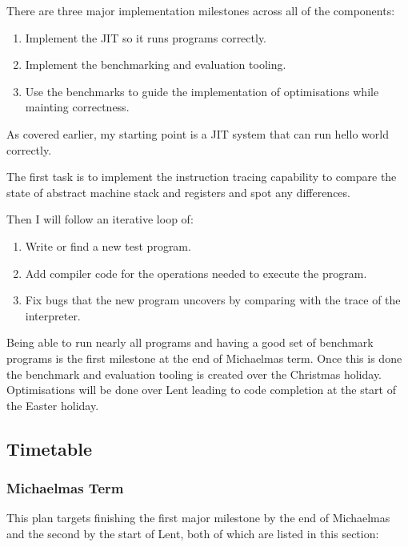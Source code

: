 \documentclass[12pt,a4paper, headings=standardclasses]{scrartcl}
\begin{document}
There are three major implementation milestones across all of the components:

\begin{enumerate}
      \item Implement the JIT so it runs programs correctly.
      \item Implement the benchmarking and evaluation tooling.
      \item Use the benchmarks to guide the implementation of optimisations
            while mainting correctness.
\end{enumerate}

As covered earlier, my starting point is a JIT system that can run hello
world correctly.

The first task is to implement the instruction tracing capability to compare
the state of abstract machine stack and registers and spot any differences.

Then I will follow an iterative loop of:

\begin{enumerate}
      \item Write or find a new test program.
      \item Add compiler code for the operations needed to execute the program.
      \item Fix bugs that the new program uncovers by comparing with the trace of the interpreter.
\end{enumerate}

Being able to run nearly all programs and having a good set of benchmark
programs is the first milestone at the end of Michaelmas term. Once this is
done the benchmark and evaluation tooling is created over the Christmas
holiday. Optimisations will be done over Lent leading to code completion at
the start of the Easter holiday.

\subsection*{Timetable}

\subsubsection*{Michaelmas Term}

This plan targets finishing the first major milestone by the end of
Michaelmas and the second by the start of Lent, both of which are listed in
this section:
\end{document}

